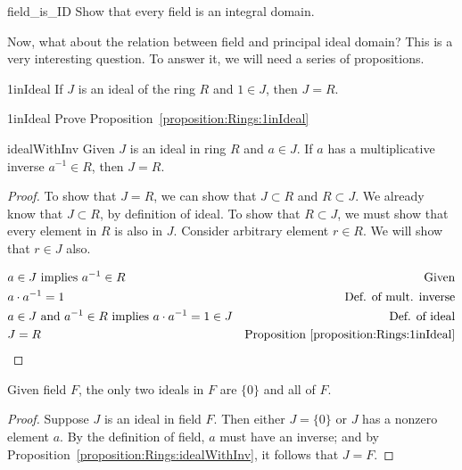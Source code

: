 \begin{exercise}{field_is_ID}
Show that every field is an integral domain. 
\end{exercise}

Now, what about the relation between field and principal ideal domain? This is  a very interesting question. To answer it, we will need a series of propositions.

\begin{prop}{1inIdeal}
If $J$ is an ideal of the ring $R$ and $1 \in J$, then $J = R$.
\end{prop}

\begin{exercise}{1inIdeal}
Prove Proposition~\ref{proposition:Rings:1inIdeal}
\end{exercise}




\begin{prop}{idealWithInv}
Given $J$ is an ideal in ring $R$ and $a\in J$.  If $a$ has a multiplicative inverse $a^{-1}\in R$, then $J=R$.
\end{prop}

\begin{proof}{}
To show that $J=R$, we can show that $J\subset R$ and $R\subset J$.  We already know that $J\subset R$, by definition of ideal.  To show that $R\subset J$, we must show that every element in $R$ is also in $J$.  Consider arbitrary element $r\in R$. We will show that $r\in J$ also.

\begin{align*}
 &a\in J \text{ implies } a^{-1}\in R & \text{Given}\\
 &a\cdot a^{-1} = 1 & \text{Def. of mult. inverse}\\
 &a\in J \text{ and } a^{-1}\in R \text{ implies } a\cdot a^{-1}=1\in J & \text{Def. of ideal}\\
 &J = R  & \text{Proposition~\ref{proposition:Rings:1inIdeal}}
\end{align*}

\end{proof}


\begin{prop}{}
Given field $F$, the only two ideals in $F$ are $\{0\}$ and all of $F$.

\begin{proof}
Suppose $J$ is an ideal in field $F$.  Then either $J=\{0\}$ or $J$ has a nonzero element $a$. By the definition of field, $a$ must have an inverse; and by Proposition~\ref{proposition:Rings:idealWithInv}, it follows that $J=F$.
\end{proof}
\end{prop}

